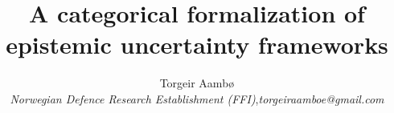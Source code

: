 \documentclass[11pt, twocolumn]{article}
\author{Torgeir Aamb\o\\%
    \textit{Norwegian Defence Research Establishment (FFI)},\quad \textit{torgeiraamboe@gmail.com}}
\title{A categorical formalization of epistemic uncertainty frameworks}
\date{}
\begin{document}
\maketitle 
 






\printbibliography{}  
\end{document}
